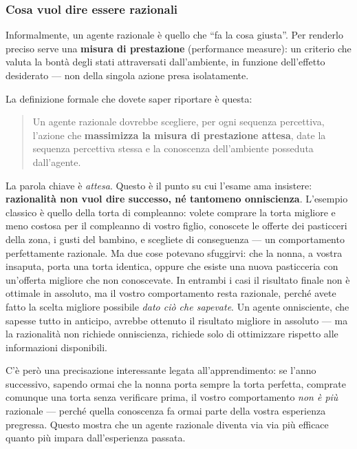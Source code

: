 \documentclass[11pt,a4paper]{article}
\begin{document}
\subsubsection{Cosa vuol dire essere razionali}

Informalmente, un agente razionale è quello che ``fa la cosa giusta''. Per renderlo preciso serve una \textbf{misura di prestazione} (performance measure): un criterio che valuta la bontà degli stati attraversati dall'ambiente, in funzione dell'effetto desiderato --- non della singola azione presa isolatamente.

La definizione formale che dovete saper riportare è questa:

\begin{quote}
Un agente razionale dovrebbe scegliere, per ogni sequenza percettiva, l'azione che \textbf{massimizza la misura di prestazione attesa}, date la sequenza percettiva stessa e la conoscenza dell'ambiente posseduta dall'agente.
\end{quote}

La parola chiave è \emph{attesa}. Questo è il punto su cui l'esame ama insistere: \textbf{razionalità non vuol dire successo, né tantomeno onniscienza}. L'esempio classico è quello della torta di compleanno: volete comprare la torta migliore e meno costosa per il compleanno di vostro figlio, conoscete le offerte dei pasticceri della zona, i gusti del bambino, e scegliete di conseguenza --- un comportamento perfettamente razionale. Ma due cose potevano sfuggirvi: che la nonna, a vostra insaputa, porta una torta identica, oppure che esiste una nuova pasticceria con un'offerta migliore che non conoscevate. In entrambi i casi il risultato finale non è ottimale in assoluto, ma il vostro comportamento resta razionale, perché avete fatto la scelta migliore possibile \emph{dato ciò che sapevate}. Un agente onnisciente, che sapesse tutto in anticipo, avrebbe ottenuto il risultato migliore in assoluto --- ma la razionalità non richiede onniscienza, richiede solo di ottimizzare rispetto alle informazioni disponibili.

C'è però una precisazione interessante legata all'apprendimento: se l'anno successivo, sapendo ormai che la nonna porta sempre la torta perfetta, comprate comunque una torta senza verificare prima, il vostro comportamento \emph{non è più} razionale --- perché quella conoscenza fa ormai parte della vostra esperienza pregressa. Questo mostra che un agente razionale diventa via via più efficace quanto più impara dall'esperienza passata.
\end{document}
